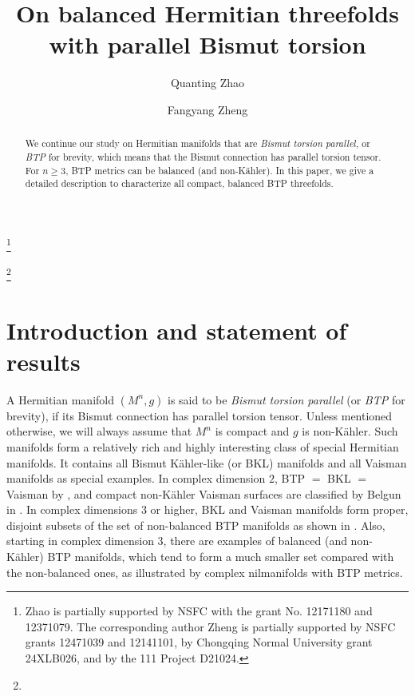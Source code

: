 \documentclass{amsart}
\numberwithin{equation}{section}
\theoremstyle{definition}
\renewcommand{\1}{\mathds{1}}
\renewcommand{\>}{\rightarrow}
\begin{document}
\title{On balanced Hermitian threefolds with parallel Bismut torsion}

\begin{abstract}
 We continue our study on Hermitian manifolds that are {\em Bismut torsion parallel,} or {\em BTP} for brevity, which means that the Bismut connection has parallel torsion tensor. For $n\geq 3$, BTP metrics can be balanced (and non-K\"ahler). In this paper, we give a detailed description to characterize all compact, balanced BTP threefolds.
\end{abstract}




\author{Quanting Zhao}
\address{Quanting Zhao. School of Mathematics and Statistics, and Hubei Key Laboratory of Mathematical Sciences, Central China Normal University, P.O. Box 71010, Wuhan 430079, P. R. China.} 
\thanks{Zhao is partially supported by NSFC with the grant No. 12171180 and 12371079. The corresponding author Zheng is partially supported by NSFC grants 12471039 and 12141101,  by Chongqing Normal University grant 24XLB026, and by the 111 Project D21024.}

\author{Fangyang Zheng}
\address{Fangyang Zheng. School of Mathematical Sciences, Chongqing Normal University, Chongqing 401331, China}
 \thanks{}



\maketitle

\tableofcontents

\section{Introduction and statement of results}

A Hermitian manifold $(M^n,g)$ is said to be {\em Bismut torsion parallel} (or {\em BTP} for brevity), if its Bismut connection has parallel torsion tensor. Unless mentioned otherwise, we will always assume that $M^n$ is compact and $g$ is non-K\"ahler. Such manifolds form a relatively rich and highly interesting class of special Hermitian manifolds. It contains all Bismut K\"ahler-like (or BKL) manifolds and all Vaisman manifolds as special examples. In complex dimension $2$, BTP $=$ BKL $=$ Vaisman by \cite{ZhaoZ19Str}, and compact non-K\"ahler Vaisman surfaces are classified by Belgun in \cite{Belgun}. In complex dimensions $3$ or higher, BKL and Vaisman manifolds form proper, disjoint subsets of the set of non-balanced BTP manifolds as shown in \cite{YZZ}. Also, starting in complex dimension $3$, there are examples of balanced (and non-K\"ahler) BTP manifolds, which tend to form a much smaller set compared with the non-balanced ones, as illustrated by complex nilmanifolds with BTP metrics.
\end{document}
